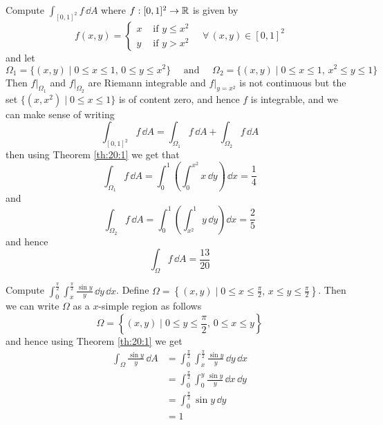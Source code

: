 \documentclass[../Analysis-3.tex]{subfiles}
\begin{document}
\begin{Eg}{}{}
  Compute $\displaystyle\int_{[0,1]^2} f \, \dd A$ where $f : [0,1]^2 \to \mathbb{R}$ is given by
  \[
    f(x,y) = \begin{cases}
      x & \mbox{ if } y \leq x^2 \\ y & \mbox{ if } y > x^2
    \end{cases} \quad \forall \, (x,y) \in [0,1]^2
  \]
  and let
  \[
    \Omega_1 = \{ (x,y) \mid 0 \leq x \leq 1, \, 0 \leq y \leq x^2 \} \quad \mbox{ and } \quad \Omega_2 = \{ (x,y) \mid 0 \leq x \leq 1, \, x^2 \leq y \leq 1 \}
  \]
  Then $f\vert_{\Omega_1}$ and $f\vert_{\Omega_2}$ are Riemann integrable and $f\vert_{y=x^2}$ is not continuous but the set $\{ (x,x^2) \mid 0 \leq x \leq 1 \}$ is of content zero, and hence $f$ is integrable, and we can make sense of writing
  \[
    \int_{[0,1]^2} f \, \dd A = \int_{\Omega_1} f \, \dd A + \int_{\Omega_2} f \, \dd A
  \]
  then using Theorem \ref{th:20:1} we get that
  \[
    \int_{\Omega_1} f \, \dd A = \int_0^1 \left( \int_0^{x^2} x \, \dd y \right)\, \dd x = \frac{1}{4}
  \]
  and
  \[
    \int_{\Omega_2} f \, \dd A = \int_0^1 \left( \int_{x^2}^1 y \, \dd y\right)\dd x = \frac{2}{5}
  \]
  and hence
  \[
    \int_{\Omega} f \, \dd A = \frac{13}{20}
  \]
\end{Eg}

\begin{Eg}{}{}
  Compute $\displaystyle{ \int_0^{\frac{\pi}{2}} \int_x^{\frac{\pi}{2}}} \frac{\sin y}{y} \, \dd y \, \dd x$. Define $\Omega = \left\{ (x,y) \mid 0 \leq x \leq \frac{\pi}{2}, \, x \leq y \leq \frac{\pi}{2} \right\}$. Then we can write $\Omega$ as a $x$-simple region as follows
  \[
    \Omega = \left\{ (x,y) \mid 0 \leq y \leq \frac{\pi}{2}, \, 0 \leq x \leq y \right\}
  \]
  and hence using Theorem \ref{th:20:1} we get
  \begin{align*}
    \int_{\Omega} \frac{\sin y}{y} \, \dd A & = \int_{0}^{\frac{\pi}{2}} \int_x^{\frac{\pi}{2}} \frac{\sin y}{y} \, \dd y \, \dd x \\
                                            & = \int_0^{\frac{\pi}{2}} \int_0^y \frac{\sin y}{y} \, \dd x \, \dd y                 \\
                                            & = \int_0^{\frac{\pi}{2}} \sin y \, \dd y                                             \\
                                            & = 1
  \end{align*}
\end{Eg}
\end{document}
